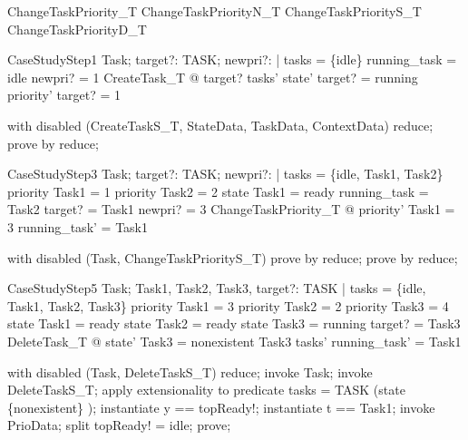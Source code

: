\begin{zed}
ChangeTaskPriority\_T  ChangeTaskPriorityN\_T \lor  ChangeTaskPriorityS\_T \lor  ChangeTaskPriorityD\_T
\end{zed}

\begin{theorem}{CaseStudyStep1}
\forall  Task; target?: TASK; newpri?: \nat  | tasks = \{idle\} \land  running\_task = idle \land  newpri? = 1 \land  CreateTask\_T @ target? \in  tasks' \land  state' target? = running \land  priority' target? = 1
\end{theorem}

\begin{zproof}[CaseStudyStep1]
with disabled (CreateTaskS\_T, StateData, TaskData, ContextData) reduce;
prove by reduce;
\end{zproof}

\begin{theorem}{CaseStudyStep3}
\forall  Task; target?: TASK; newpri?: \nat  | tasks = \{idle, Task1, Task2\} \land  priority Task1 = 1 \land  priority Task2 = 2 \land  state Task1 = ready \land  running\_task = Task2 \land  target? = Task1 \land  newpri? = 3 \land  ChangeTaskPriority\_T @ priority' Task1 = 3 \land  running\_task' = Task1
\end{theorem}

\begin{zproof}[CaseStudyStep3]
with disabled (Task, ChangeTaskPriorityS\_T) prove by reduce;
prove by reduce;
\end{zproof}

\begin{theorem}{CaseStudyStep5}
\forall  Task; Task1, Task2, Task3, target?: TASK | tasks = \{idle, Task1, Task2, Task3\} \land  priority Task1 = 3 \land  priority Task2 = 2 \land  priority Task3 = 4 \land  state Task1 = ready \land  state Task2 = ready \land  state Task3 = running \land  target? = Task3 \land  DeleteTask\_T @ state' Task3 = nonexistent \land  Task3 \notin  tasks' \land  running\_task' = Task1
\end{theorem}

\begin{zproof}[CaseStudyStep5]
with disabled (Task, DeleteTaskS\_T) reduce;
invoke Task;
invoke DeleteTaskS\_T;
apply extensionality to predicate tasks = TASK \setminus  (state \inv  \limg  \{nonexistent\} \rimg );
instantiate y == topReady!;
instantiate t == Task1;
invoke PrioData;
split topReady! = idle;
prove;
\end{zproof}


